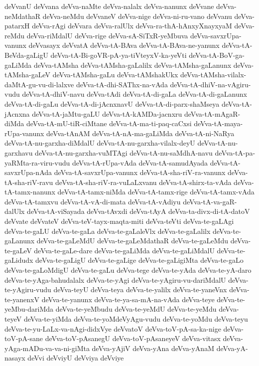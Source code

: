 {deVvanU
deVvana
deVva-naMte
deVva-nalalx
deVva-nanunx
deVvane
deVva-neMdathaR
deVva-neMdu
deVvaneV
deVva-nige
deVva-ni-ru-vano
deVvanu
deVva-patarxH
deVva-rAgi
deVvara
deVva-ralUlx
deVva-ra-thA-hAnxyXnayxyaM
deVva-reMdu
deVva-riMdalU
deVva-rige
deVva-sA-SiTxR-yeMbuva
deVva-savxrUpa-vanunx
deVvasayx
deVvatA
deVva-tA-BAva
deVva-tA-BAva-ne-yanunx
deVva-tA-BeVda-gaLigU
deVva-tA-Bi-goVR-pA-ya-tiVteyxV-ka-yeVti
deVva-tA-BoV-ga-gaLiMda
deVva-tAMsha
deVva-tAMsha-gaLalilx
deVva-tAMsha-gaLanunx
deVva-tAMsha-gaLeV
deVva-tAMsha-gaLu
deVva-tAMshakUkx
deVva-tAMsha-vilalx-daMtA-gu-vu-di-lalxve
deVva-tA-dhi-SAThx-na-vAda
deVva-tA-dhiV-na-vAgiru-vudu
deVva-tA-dhiV-navu
deVva-tAdi
deVva-tA-di-gaLa
deVva-tA-di-gaLanunx
deVva-tA-di-gaLu
deVva-tA-di-jAcnxnavU
deVva-tA-di-parx-shaMseya
deVva-tA-jAcnxna
deVva-tA-jaMtu-gaLU
deVva-tA-kAMDa-jacnxru
deVva-tA-mAgaR-diMda
deVva-tA-mU-tiR-ciMtane
deVva-tA-ma-ti-paq-caCxsi
deVva-tA-maya-rUpa-vanunx
deVva-tAnAM
deVva-tA-nA-ma-gaLiMda
deVva-tA-ni-NaRya
deVva-tA-nu-garxha-diMdalU
deVva-tA-nu-garxha-vilalx-deyU
deVva-tA-nu-garxhavu
deVva-tA-nu-garxha-vuMTAgi
deVva-tA-nu-saMdhA-navu
deVva-tA-pa-yaRMta-ra-viru-vudu
deVva-tA-rUpa-vAda
deVva-tA-samudAyada
deVva-tA-savxrUpa-nAda
deVva-tA-savxrUpa-vanunx
deVva-tA-sha-riV-ra-vanunx
deVva-tA-sha-riV-ravu
deVva-tA-sha-riV-ra-vuLaLxvanu
deVva-tA-shirx-ta-vAda
deVva-tA-tamx-nanunx
deVva-tA-tamx-niMda
deVva-tA-tamx-rige
deVva-tA-tamx-vAda
deVva-tA-tamxvu
deVva-tA-vA-di-mata
deVva-tA-vAdiyu
deVva-tA-va-gaR-dalUlx
deVva-tA-viSayada
deVva-tAvxdi
deVva-tAyA
deVva-ta-divx-di-tA-datoV
deVvate
deVvateV
deVva-teV-tayx-maqta-miti
deVva-teVti
deVva-te-gaLAgi
deVva-te-gaLU
deVva-te-gaLa
deVva-te-gaLaleVlx
deVva-te-gaLalilx
deVva-te-gaLanunx
deVva-te-gaLeMdU
deVva-te-gaLeMdathaR
deVva-te-gaLeMdu
deVva-te-gaLeV
deVva-te-gaLe-dare
deVva-te-gaLiMda
deVva-te-gaLiMdalU
deVva-te-gaLidudx
deVva-te-gaLigU
deVva-te-gaLige
deVva-te-gaLigiMta
deVva-te-gaLo
deVva-te-gaLoMdigU
deVva-te-gaLu
deVva-tege
deVva-te-yAda
deVva-te-yA-daro
deVva-te-yAga-bahudalalx
deVva-te-yAgi
deVva-te-yAgiru-vu-dariMdalU
deVva-te-yAgiru-vudu
deVva-teyU
deVva-teya
deVva-te-yalilx
deVva-te-yaneVnx
deVva-te-yanenxV
deVva-te-yanunx
deVva-te-ya-sa-mA-na-vAda
deVva-teye
deVva-te-yeMbu-dariMda
deVva-te-yeMbudu
deVva-te-yeMdU
deVva-te-yeMdu
deVva-teyeV
deVva-te-yiMda
deVva-te-yoMdeVyAgu-vudu
deVva-te-yoMdu
deVva-teyu
deVva-te-yu-LaLx-va-nAgi-didxVye
deVvatoV
deVva-toV-pA-sa-ka-nige
deVva-toV-pA-sane
deVva-toV-pAsanegU
deVva-toV-pAsaneyeV
deVva-vitasx
deVva-yAga-mADu-va-va-ni-giMta
deVva-yAjiV
deVva-yAna
deVva-yAnaM
deVva-yA-nasayx
deVvi
deVviyU
deVviya
deVviye
}
